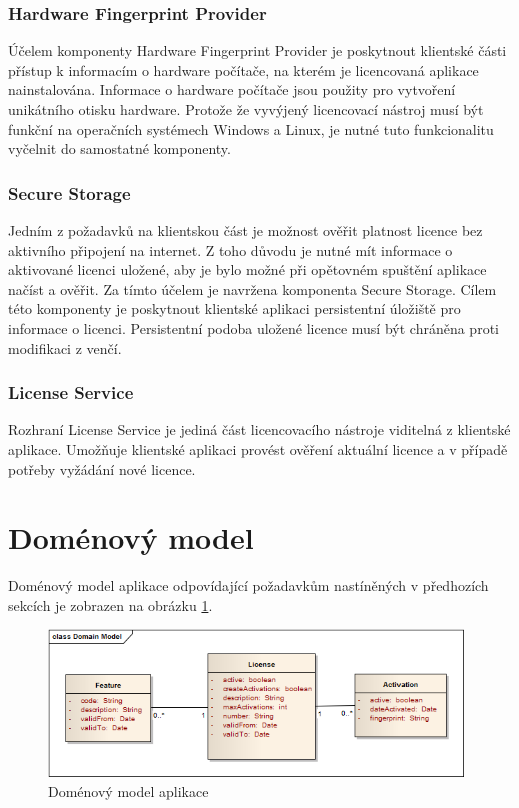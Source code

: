 \subsubsection*{Hardware Fingerprint Provider}

Účelem komponenty Hardware Fingerprint Provider je poskytnout klientské části
přístup k informacím o hardware počítače, na kterém je licencovaná aplikace
nainstalována. Informace o hardware počítače jsou použity pro vytvoření
unikátního otisku hardware. Protože že vyvýjený licencovací nástroj
musí být funkční na operačních systémech Windows a Linux, je nutné tuto
funkcionalitu vyčelnit do samostatné komponenty. 

\subsubsection*{Secure Storage}

Jedním z požadavků na klientskou část je možnost ověřit platnost licence bez
aktivního připojení na internet. Z toho důvodu je nutné mít informace o
aktivované licenci uložené, aby je bylo možné při opětovném spuštění aplikace
načíst a ověřit. Za tímto účelem je navržena komponenta Secure Storage. Cílem
této komponenty je poskytnout klientské aplikaci persistentní úložiště pro
informace o licenci. Persistentní podoba uložené licence musí být chráněna proti
modifikaci z venčí.

\subsubsection*{License Service}
 
Rozhraní License Service je jediná část licencovacího nástroje viditelná z
klientské aplikace. Umožňuje klientské aplikaci provést ověření aktuální licence
a v případě potřeby vyžádání nové licence.

\section{Doménový model}

Doménový model aplikace odpovídající požadavkům nastíněných v předhozích
sekcích je zobrazen na obrázku \ref{fig:domain}.


\begin{figure}[tbh]
\begin{center}
\includegraphics[width=11cm]{figures/domain.png}
\caption{Doménový model aplikace}
\label{fig:domain} 
\end{center}
\end{figure}

